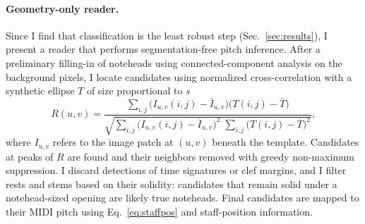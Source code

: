 \paragraph{Geometry-only reader.}
Since I find that classification is the least robust step
(Sec.~\ref{sec:results}), I present a reader that performs segmentation-free pitch
inference. After a preliminary filling-in of noteheads using connected-component
analysis on the background pixels, I locate candidates using normalized
cross-correlation with a synthetic ellipse $T$ of size proportional to $s$
\begin{equation}
  R(u,v) = \frac{\sum_{i,j} \big(I_{u,v}(i,j)-\bar I_{u,v}\big)\big(T(i,j)-\bar T\big)}
                {\sqrt{\sum_{i,j}\big(I_{u,v}(i,j)-\bar I_{u,v}\big)^2\;\sum_{i,j}\big(T(i,j)-\bar T\big)^2}},
  \label{eq:ncc}
\end{equation}
where $I_{u,v}$ refers to the image patch at $(u,v)$ beneath the template.
Candidates at peaks of $R$ are found and their neighbors removed with greedy
non-maximum suppression. I discard detections of time signatures or clef margins,
and I filter rests and stems based on their solidity: candidates that remain
solid under a notehead-sized opening are likely true noteheads. Final candidates
are mapped to their MIDI pitch using Eq.~\eqref{eq:staffpos} and staff-position
information.
